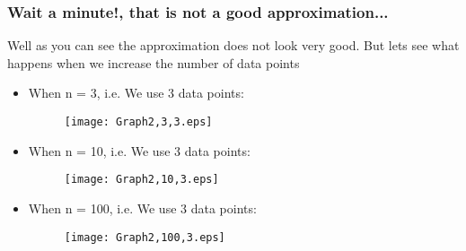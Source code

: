 \documentclass[10pt]{beamer}
\begin{document}
	\begin{frame}
		\frametitle{Wait a minute!, that is not a good approximation...}
		Well as you can see the approximation does not look very good. But lets see what happens when we increase the number of data points
		\begin{itemize}
			\item When n = 3, i.e. We use 3 data points:
		\begin{figure}[h]
			\texttt{[image: Graph2,3,3.eps]}
		\end{figure}
		\end{itemize}
	\end{frame}

	\begin{frame}
		
		\begin{itemize}
			\item When n = 10, i.e. We use 3 data points:
			\begin{figure}[h]
				\texttt{[image: Graph2,10,3.eps]}
			\end{figure}
		\end{itemize}
	
	\end{frame}

		\begin{frame}
		
		\begin{itemize}
			\item When n = 100, i.e. We use 3 data points:
			\begin{figure}[h]
				\texttt{[image: Graph2,100,3.eps]}
			\end{figure}
		\end{itemize}
		
	\end{frame}
\end{document}
